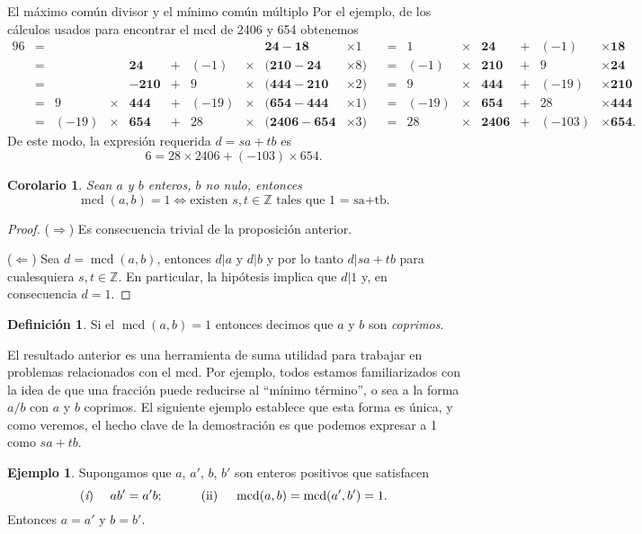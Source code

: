 \documentclass[11pt,spanish,makeidx]{amsbook}
\newtheorem{corolario}[teorema]{Corolario}
\theoremstyle{definition}
\newtheorem{definicion}{Definici\'on}[section]
\newtheorem{ejemplo}{Ejemplo}[section]
\theoremstyle{remark}
\newcommand \mcd{\operatorname{mcd}}
\begin{document}
\begin{section}{El máximo común divisor y el mínimo común múltiplo}
Por el ejemplo, de los cálculos usados para encontrar el mcd de 2406 y 654 obtenemos
\begin{alignat*}9 6&=&&&&&&&\mathbf{24}-\mathbf{18}&\times1&&=
&1&\times&\mathbf{24}&+&(-1) &\times \mathbf{18 }\\
&=&&&\mathbf{24}&+&(-1)&\times&(\mathbf{210}-\mathbf{24}&\times8)&&=
&(-1)&\times&\mathbf{210}&+&9&\times \mathbf{24}\\
&=&&&\mathbf{-210}&+&9&\times&(\mathbf{444}-\mathbf{210}&\times2)&&=
&9&\times&\mathbf{444}&+&(-19) &\times \mathbf{210}\\
&=&9&\times&\mathbf{444}&+&(-19)&\times&(\mathbf{654}-\mathbf{444}&\times1)&&=
&(-19)&\times&\mathbf{654}&+&28 &\times \mathbf{444}\\
&=&(-19)&\times&\mathbf{654}&+&28&\times&(\mathbf{2406}-\mathbf{654}&\times3)&&=
&28&\times&\mathbf{2406}&+&(-103) &\times \mathbf{654}.
\end{alignat*}
De este modo, la expresión requerida $d=sa+tb$ es
$$
6=28\times2406+(-103)\times 654.
$$

\begin{corolario} Sean $a$ y $b$ enteros, $b$ no nulo, entonces
$$
\mcd(a,b) = 1 \Leftrightarrow \text{existen $s,t \in \mathbb Z$ tales que 1 = sa+tb.}
$$
\end{corolario}
\begin{proof}
($\Rightarrow$) Es consecuencia trivial de la proposición anterior.

($\Leftarrow$) Sea $d = \mcd(a,b)$, entonces $d|a$ y $d|b$ y por lo tanto $d|sa+tb$ para cualesquiera   $s,t \in \mathbb Z$.  En particular, la hipótesis implica que $d|1$ y, en consecuencia $d =1$. 
\end{proof}

\begin{definicion}
Si el $\mcd(a,b)=1$ entonces decimos que $a$ y $ b$ son {\em coprimos}.
\end{definicion}

El resultado  anterior  es una herramienta de suma utilidad para trabajar en problemas relacionados con el mcd. Por ejemplo, todos estamos familiarizados con la idea de que una fracción puede reducirse al ``mínimo término'', o sea a la forma $a/b$ con $a$ y $b$ coprimos. El siguiente ejemplo establece que esta forma es única, y como veremos, el hecho clave de la demostración es que podemos expresar a 1 como $sa+tb$.

\begin{ejemplo} Supongamos que $a$, $a'$, $b$, $b'$ son enteros positivos que satisfacen
$$
\text{({\em i}) }\quad ab'=a'b; \qquad\quad\text{(ii) }
\quad\mcd(a,b)=\mcd(a',b')=1.
$$
Entonces $a=a'$ y $b=b' $.


\end{ejemplo}
\end{section}
\end{document}

